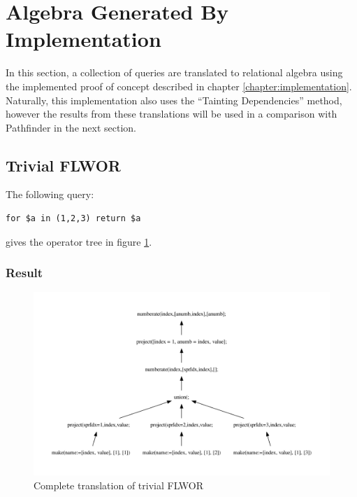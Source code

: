 \newpage
\section{Algebra Generated By Implementation}
\label{sect:result:implementation_algebra}
In this section, a collection of queries are translated to relational
algebra using the implemented proof of concept described in chapter
\ref{chapter:implementation}. Naturally, this implementation also uses the
``Tainting Dependencies'' method, however the results from these translations
will be used in a comparison with Pathfinder in the next section.

\subsection{Trivial FLWOR}
\label{sect:results:algebra:generated:trivial_flwor}

The following query:
\begin{Verbatim}
for $a in (1,2,3) return $a
\end{Verbatim}

gives the operator tree in figure \ref{fig:results:query_trivial_flwor_result}.

\subsubsection{Result}
\begin{figure}[!htp]
\begin{center}
  \includegraphics[width=1.0\textwidth]{img/graphs/td_impl_flwor_simple_xq_relalg} \caption{Complete translation
  of trivial FLWOR}
  \label{fig:results:query_trivial_flwor_result}
\end{center}
\end{figure}

